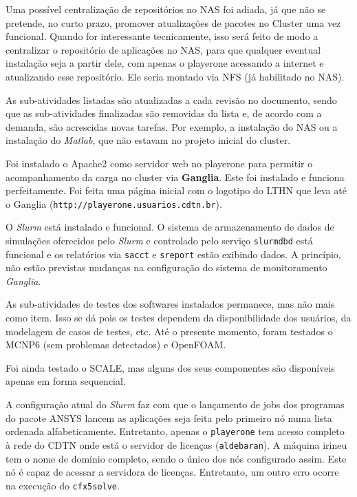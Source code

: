 Uma possível centralização de repositórios no NAS foi adiada, já que não se pretende, no curto prazo, promover atualizações de pacotes no Cluster uma vez 
funcional. Quando for interessante tecnicamente, isso será feito de modo a centralizar o repositório de aplicações no NAS, para que qualquer eventual instalação seja a partir dele, com apenas o playerone acessando a internet e atualizando esse repositório. Ele seria montado via NFS (já habilitado no NAS).

As sub-atividades listadas são atualizadas a cada revisão no documento, sendo que 
as sub-atividades finalizadas são removidas da lista e, de acordo com a demanda, 
são acrescidas novas tarefas. Por exemplo, a instalação do NAS ou a instalação do 
\textit{Matlab}, que não estavam no projeto inicial do cluster.

Foi instalado o Apache2 como servidor web no playerone para permitir o acompanhamento da carga no cluster via \textbf{Ganglia}. Este foi instalado 
e funciona perfeitamente. Foi feita uma página inicial com o logotipo do LTHN 
que leva até o Ganglia (\texttt{http://playerone.usuarios.cdtn.br}).

O \textit{Slurm} está instalado e funcional. O sistema de armazenamento de dados de simulações oferecidos pelo \textit{Slurm} e controlado pelo serviço \texttt{slurmdbd} está funcional e os relatórios via \texttt{sacct} e \texttt{sreport} estão exibindo dados. %
A princípio, não estão previstas mudanças na configuração do sistema de monitoramento \textit{Ganglia}.

As sub-atividades de testes dos softwares instalados permanece, mas não mais como item. Isso se dá pois os testes dependem da disponibilidade dos usuários, da modelagem de casos de testes, etc. Até o presente momento, foram testados o MCNP6 (sem problemas detectados) e OpenFOAM.

Foi ainda testado o SCALE, mas alguns dos seus componentes são disponíveis apenas 
em forma sequencial.

A configuração atual do \textit{Slurm} faz com que o lançamento de jobs dos 
programas do pacote ANSYS lancem as aplicações seja feita pelo primeiro nó 
numa lista ordenada alfabeticamente. Entretanto, apenas o \texttt{playerone} 
tem acesso completo à rede do CDTN onde está o servidor de licenças (\texttt{aldebaran}). A máquina irineu tem o nome de domínio completo, sendo 
o único dos nós configurado assim. Este nó é capaz de acessar a servidora de 
licenças. Entretanto, um outro erro ocorre na execução do \texttt{cfx5solve}.

